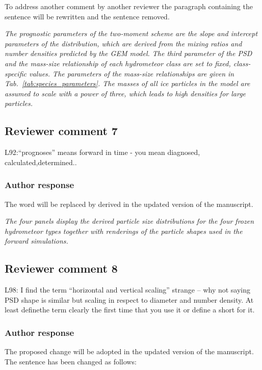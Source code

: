 \documentclass[11pt]{scrartcl}
\begin{document}
To address another comment by another reviewer the paragraph containing the sentence
will be rewritten and the sentence removed.

\textit{ The prognostic parameters of the two-moment scheme are the slope and
  intercept parameters of the distribution, which are derived from the mixing
  ratios and number densities predicted by the GEM model. The third parameter of
  the PSD and the mass-size relationship of each hydrometeor class are set to
  fixed, class-specific values. The parameters of the mass-size relationships
  are given in Tab.~\ref{tab:species_parameters}. The masses of all ice
  particles in the model are assumed to scale with a power of three, which leads
  to high densities for large particles.}



\subsection*{Reviewer comment 7}

L92:“prognoses”   means   forward   in   time   -   you   mean   diagnosed,   calculated,determined..

\subsubsection*{Author response}

The  word will be replaced by derived in the updated version of the manuscript.

\textit{The four panels display the derived particle size distributions for the
  four frozen hydrometeor types together with renderings of the particle shapes
  used in the forward simulations.}


\subsection*{Reviewer comment 8}
L98: I find the term “horizontal and vertical scaling” strange – why not saying PSD shape is similar but scaling in respect to diameter and number density. At least definethe term clearly the first time that you use it or define a short for it.

\subsubsection*{Author response}
 
The proposed  change will be adopted in the updated version of the manuscript. The sentence has been changed
as follows:
\end{document}
